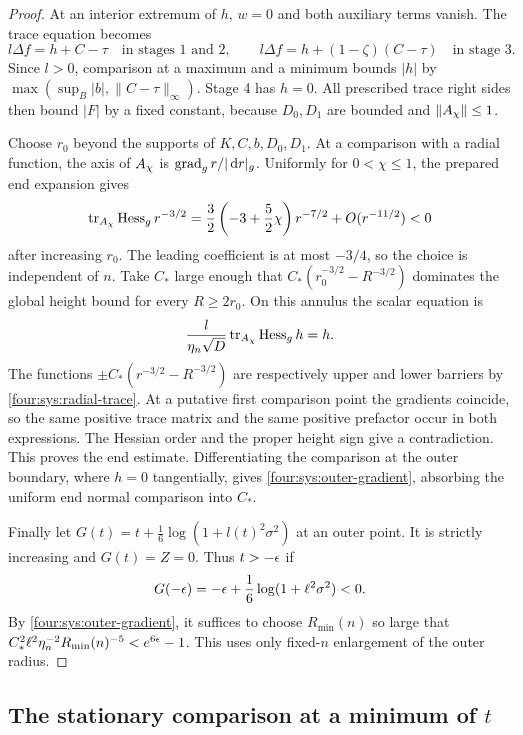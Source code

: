 \begin{proof}
At an interior extremum of $h$, $w=0$ and both auxiliary terms vanish.
The trace equation becomes
\[
 l\Delta f=h+C-\tau\quad\text{in stages 1 and 2},\qquad
 l\Delta f=h+(1-\zeta)(C-\tau)\quad\text{in stage 3}.
\]
Since $l>0$, comparison at a maximum and a minimum bounds $|h|$ by
$\max(\sup_B|b|,\|C-\tau\|_\infty)$.  Stage 4 has $h=0$.
All prescribed trace right sides then bound $|F|$ by a fixed constant,
because $D_0,D_1$ are bounded and $\|A_\chi\|\le1$.

Choose $r_0$ beyond the supports of $K,C,b,D_0,D_1$.  At a comparison
with a radial function, the axis of $A_\chi$ is
$\operatorname{grad}_g r/|\,\mathrm d r|_g$.  Uniformly for $0<\chi\le1$, the prepared end
expansion gives
\begin{equation}\label{four:sys:radial-trace}
 \operatorname{tr}_{A_\chi}\operatorname{Hess}_g r^{-3/2}
 =\frac32\left(-3+\frac52\chi\right)r^{-7/2}
                +O(r^{-11/2})<0
\end{equation}
after increasing $r_0$.  The leading coefficient is at most $-3/4$,
so the choice is independent of $n$.  Take $C_*$ large enough that
$C_*(r_0^{-3/2}-R^{-3/2})$ dominates the global height bound for every
$R\ge2r_0$.  On this annulus the scalar equation is
\[
 \frac{l}{\eta_n\sqrt D}\operatorname{tr}_{A_\chi}\operatorname{Hess}_g h=h.
\]
The functions $\pm C_*(r^{-3/2}-R^{-3/2})$ are respectively upper and
lower barriers by \eqref{four:sys:radial-trace}.  At a putative first
comparison point the gradients coincide, so the same positive trace
matrix and the same positive prefactor occur in both expressions.
The Hessian order and the proper height sign give a contradiction.
This proves the end estimate.  Differentiating the comparison at the
outer boundary, where $h=0$ tangentially, gives
\eqref{four:sys:outer-gradient}, absorbing the uniform end normal comparison
into $C_*$.

Finally let $G(t)=t+\frac16\log(1+l(t)^2\sigma^2)$ at an outer point.
It is strictly increasing and $G(t)=Z=0$.  Thus $t>-\epsilon$ if
\[
 G(-\epsilon)=-\epsilon+\frac16\log(1+\ell^2\sigma^2)<0.
\]
By \eqref{four:sys:outer-gradient}, it suffices to choose
$R_{\min}(n)$ so large that
$C_*^2\ell^2\eta_n^{-2}R_{\min}(n)^{-5}<e^{6\epsilon}-1$.
This uses only fixed-$n$ enlargement of the outer radius.
\end{proof}

\subsection{The stationary comparison at a minimum of \texorpdfstring{$t$}{t}}

